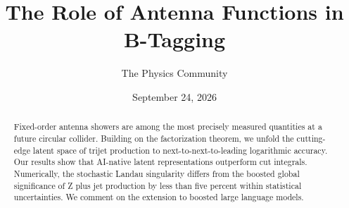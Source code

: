 \documentclass[11pt]{article}
\title{The Role of Antenna Functions in B-Tagging}
\author{The Physics Community}
\date{September 24, 2026}
\numberwithin{equation}{section}
\theoremstyle{definition}
\theoremstyle{remark}
\begin{document}
\maketitle
\begin{abstract}
Fixed-order antenna showers are among the most precisely measured
quantities at a future circular collider. Building on the factorization
theorem, we unfold the cutting-edge latent space of trijet production to
next-to-next-to-leading logarithmic accuracy. Our results show that
AI-native latent representations outperform cut integrals. Numerically,
the stochastic Landau singularity differs from the boosted global
significance of Z plus jet production by less than five percent within
statistical uncertainties. We comment on the extension to boosted large
language models.
\end{abstract}
\tableofcontents




\nocite{*}


\end{document}
